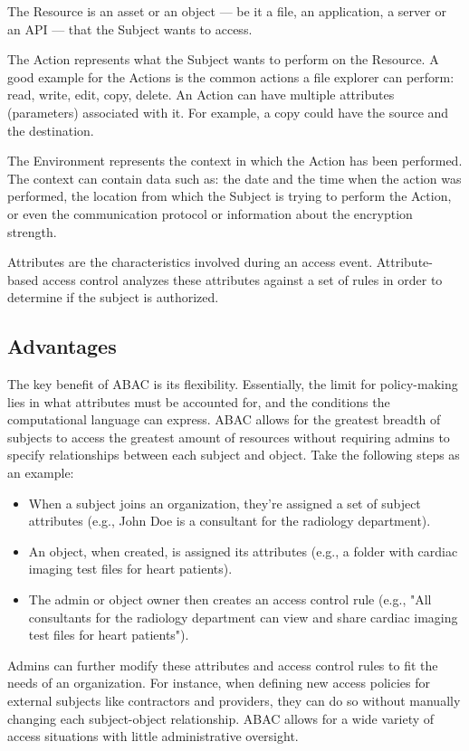 The Resource is an asset or an object --- be it a file, an application, 
a server or an API --- that the Subject wants to access. 

The Action represents what the Subject wants to perform on the Resource. 
A good example for the Actions is the common actions a file explorer can perform: read, 
write, edit, copy, delete. An Action can have multiple attributes (parameters) 
associated with it. For example, a copy could have the source and the destination.

The Environment represents the context in which the Action has been performed. 
The context can contain data such as: the date and the time when the action was 
performed, the location from which the Subject is trying to perform the Action, 
or even the communication protocol or information about the encryption strength.

Attributes are the characteristics involved during an access event. Attribute-based
access control analyzes these attributes against a set of rules in order to determine
if the subject is authorized.

\subsection*{Advantages}
The key benefit of ABAC is its flexibility. Essentially, the limit for policy-making lies in what attributes must be accounted for, and the conditions the computational language can express. ABAC allows for the greatest breadth of subjects to access the greatest amount of resources without requiring admins to specify relationships between each subject and object. Take the following steps as an example:

\begin{itemize}
    \item When a subject joins an organization, they're assigned a set of subject attributes (e.g., John Doe is a consultant for the radiology department).
    \item An object, when created, is assigned its attributes (e.g., a folder with cardiac imaging test files for heart patients).
    \item  The admin or object owner then creates an access control rule (e.g., "All consultants for the radiology department can view and share cardiac imaging test files for heart patients").
\end{itemize}

Admins can further modify these attributes and access control rules to fit the needs of an organization. For instance, when defining new access policies for external subjects like contractors and providers, they can do so without manually changing each subject-object relationship. ABAC allows for a wide variety of access situations with little administrative oversight.

